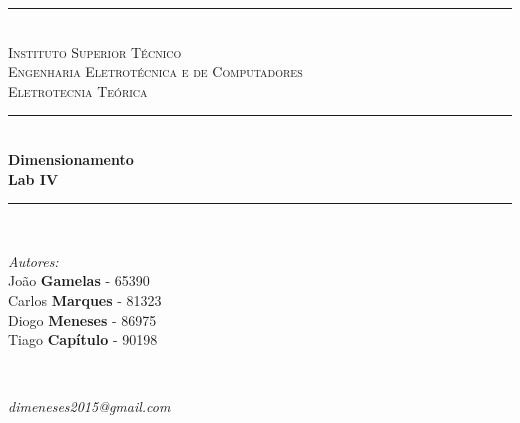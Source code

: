 \begin{titlepage}

\renewcommand{\theenumi}{\alph{enumi}}
\newcommand{\HRule}{\rule{\linewidth}{0.5mm}} %

\center %

\HRule \\[0.2cm]
\textsc{\LARGE Instituto Superior Técnico}\\[4.5cm] %
\textsc{\Large Engenharia Eletrotécnica e de Computadores}\\[0.5cm] %
\textsc{\large Eletrotecnia Teórica}\\[0.5cm] %


\HRule \\[0.4cm]
{ \huge \bfseries Dimensionamento \vspace{1cm}\\\LARGE Lab IV}\\[0.4cm] %
\HRule \\[1.5cm]


\begin{minipage}{0.4\textwidth}
\begin{flushleft} \Large
\emph{Autores:}\\
\large
João \textbf{Gamelas} - 65390\hspace{2.5cm}
\\Carlos \textbf{Marques} - 81323 \hspace{2.5cm}
\\Diogo \textbf{Meneses} - 86975 \hspace{2.5cm}
\\Tiago \textbf{Capítulo} - 90198 \hspace{2.5cm}
\end{flushleft}
\end{minipage}
~
\begin{minipage}{0.35\textwidth}
\begin{flushright} \large
\vspace{1.0cm}
\emph{dimeneses2015@gmail.com}
\end{flushright}
\end{minipage}\\[1.7 cm]



\end{titlepage}
